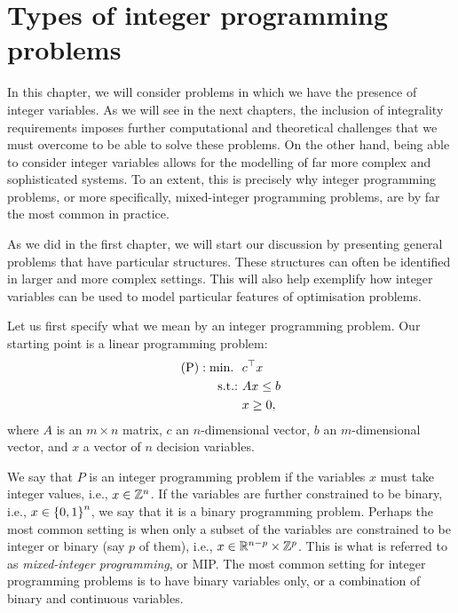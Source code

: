 \section{Types of integer programming problems}

In this chapter, we will consider problems in which we have the presence of integer variables. As we will see in the next chapters, the inclusion of integrality requirements imposes further computational and theoretical challenges that we must overcome to be able to solve these problems. On the other hand, being able to consider integer variables allows for the modelling of far more complex and sophisticated systems. To an extent, this is precisely why integer programming problems, or more specifically, mixed-integer programming problems, are by far the most common in practice.

As we did in the first chapter, we will start our discussion by presenting general problems that have particular structures. These structures can often be identified in larger and more complex settings. This will also help exemplify how integer variables can be used to model particular features of optimisation problems.

Let us first specify what we mean by an integer programming problem. Our starting point is a linear programming problem:
  \begin{align*}
	  \text{(P)} : \mathop{\text{min.~}} \ &c^\top x \\
	  \mathop{\text{s.t.:~}} & Ax \leq b \\
	  & x \geq 0,
  \end{align*}
  where $A$ is an $m \times n$ matrix, $c$ an $n$-dimensional vector, $b$ an $m$-dimensional vector, and $x$ a vector of $n$ decision variables. 
  
  We say that $P$ is an integer programming problem if the variables $x$ must take integer values, i.e., $x \in \mathbb{Z}^n$. If the variables are further constrained to be binary, i.e., $x \in \left\{ 0,1 \right \}^n$, we say that it is a binary programming problem. Perhaps the most common setting is when only a subset of the variables are constrained to be integer or binary (say $p$ of them), i.e., $x \in \mathbb{R}^{n-p} \times \mathbb{Z}^p$. This is what is referred to as \emph{mixed-integer programming}, or MIP. The most common setting for integer programming problems is to have binary variables only, or a combination of binary and continuous variables. 
   
